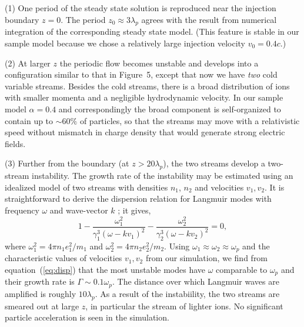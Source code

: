 \noindent
(1) One period of the steady state solution is reproduced near the injection
boundary $z=0$. The period $z_0\approx 3\lambda_p$ agrees with the result
from numerical integration of the corresponding steady state model.
(This feature is stable in our sample model
because we chose a relatively large injection velocity $v_0=0.4c$.)

\noindent
(2) At larger $z$ the periodic flow becomes unstable and develops into a
configuration similar to that in Figure~5, except that now we have {\it two}
cold variable streams. Besides the cold streams, there is a broad distribution
of ions with smaller momenta and a negligible hydrodynamic velocity.
In our sample model $\alpha=0.4$ and
correspondingly the broad component is self-organized to contain up to
$\sim 60\%$ of particles, so that the streams may move with a relativistic speed
without mismatch in charge density that would generate strong electric fields.

\noindent
(3) Further from the boundary (at $z>20\lambda_p$), the two streams
develop a two-stream instability. The growth rate of the instability may be
estimated using an idealized model of two streams with densities $n_1$,
$n_2$ and velocities $v_1,v_2$. It is straightforward to derive the dispersion
relation for Langmuir modes with frequency $\omega$ and wave-vector $k$
\citep[e.g.][]{melrose_instabilities_1986};
it gives,
\begin{equation}
\label{eq:disp}
    1-\frac{\omega_1^{2}}{\gamma_1^3(\omega - kv_1)^2} - \frac{\omega_2^{2}}{\gamma_2^3(\omega - kv_2)^2} = 0,
\end{equation}
where $\omega_1^2=4\pi n_1 e_1^2/m_1$ and $\omega_2^2=4\pi n_2 e_2^2/m_2$.
Using $\omega_1\approx\omega_2\approx\omega_p$ and the characteristic values
of velocities $v_1,v_2$ from our simulation, we find from equation~(\ref{eq:disp}) that
the most unstable modes have $\omega$ comparable to $\omega_p$ and their
growth rate is $\Gamma\sim 0.1\omega_p$.
The distance over which Langmuir waves are amplified is roughly
 $10\lambda_p$.
As a result of the instabiility, the two streams are smeared out at large $z$,
in particular the stream of lighter ions.
No significant particle acceleration is seen in the simulation.

